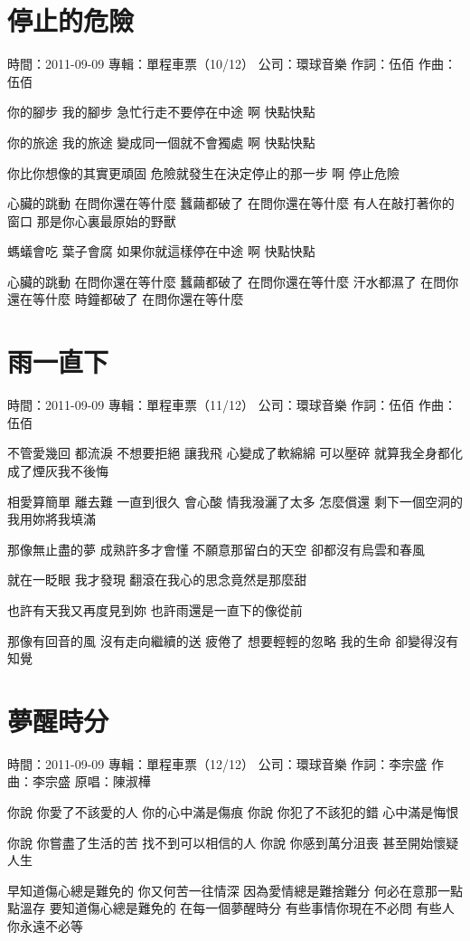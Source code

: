 \documentclass[UTF8,a4paper,oneside,twocolumn,12pt]{ctexbook}
\newcommand{\infopair}[2]{\textbullet #1：#2}
\newcommand{\zc}[1][伍佰]{\infopair{作詞}{#1}}
\newcommand{\zq}[1][伍佰]{\infopair{作曲}{#1}}
\newcommand{\zj}[1]{\infopair{專輯}{#1}}
\newcommand{\yc}[1]{\infopair{原唱}{#1}}
\newcommand{\sj}[1]{\infopair{時間}{#1}}
\newcommand{\gs}[1]{\infopair{公司}{#1}}
\newenvironment{info}{\begin{flushleft}\kaishu
	}
	{\end{flushleft}\normalsize\yahei\par}
\newenvironment{lyric}{
	}
{}
\begin{document}
\section{停止的危險}
\begin{info}
	\sj{2011-09-09}
	\zj{單程車票（10/12）}
	\gs{環球音樂}
	\zc
	\zq
\end{info}
\begin{lyric}
	你的腳步 我的腳步
	急忙行走不要停在中途
	啊 快點快點

	你的旅途 我的旅途
	變成同一個就不會獨處
	啊 快點快點

	你比你想像的其實更頑固
	危險就發生在決定停止的那一步
	啊 停止危險

	心臟的跳動 在問你還在等什麼
	蠶繭都破了 在問你還在等什麼
	有人在敲打著你的窗口
	那是你心裏最原始的野獸

	螞蟻會吃 葉子會腐
	如果你就這樣停在中途
	啊 快點快點

	心臟的跳動 在問你還在等什麼
	蠶繭都破了 在問你還在等什麼
	汗水都濕了 在問你還在等什麼
	時鐘都破了 在問你還在等什麼
\end{lyric}

\section{雨一直下}
\begin{info}
	\sj{2011-09-09}
	\zj{單程車票（11/12）}
	\gs{環球音樂}
	\zc
	\zq
\end{info}
\begin{lyric}
	不管愛幾回 都流淚
	不想要拒絕 讓我飛
	心變成了軟綿綿 可以壓碎
	就算我全身都化成了煙灰我不後悔

	相愛算簡單 離去難
	一直到很久 會心酸
	情我潑灑了太多 怎麼償還
	剩下一個空洞的我用妳將我填滿

	那像無止盡的夢
	成熟許多才會懂
	不願意那留白的天空
	卻都沒有烏雲和春風

	就在一眨眼 我才發現
	翻滾在我心的思念竟然是那麼甜

	也許有天我又再度見到妳
	也許雨還是一直下的像從前

	那像有回音的風
	沒有走向繼續的送
	疲倦了 想要輕輕的忽略
	我的生命 卻變得沒有知覺
\end{lyric}

\section{夢醒時分}
\begin{info}
	\sj{2011-09-09}
	\zj{單程車票（12/12）}
	\gs{環球音樂}
	\zc[李宗盛]
	\zq[李宗盛]
	\yc{陳淑樺}
\end{info}
\begin{lyric}
	你說 你愛了不該愛的人 你的心中滿是傷痕
	你說 你犯了不該犯的錯 心中滿是悔恨

	你說 你嘗盡了生活的苦 找不到可以相信的人
	你說 你感到萬分沮喪 甚至開始懷疑人生

	早知道傷心總是難免的 你又何苦一往情深
	因為愛情總是難捨難分 何必在意那一點點溫存
	要知道傷心總是難免的 在每一個夢醒時分
	有些事情你現在不必問 有些人你永遠不必等
\end{lyric}
\end{document}

